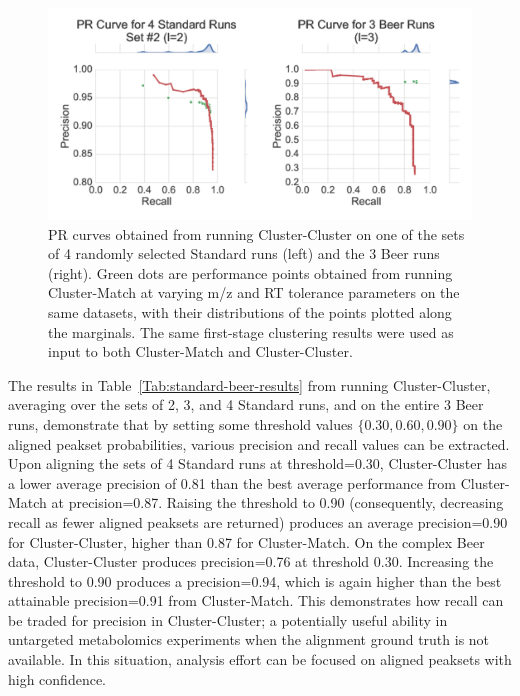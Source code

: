 \begin{figure}[!htbp]
\centering
\includegraphics[width=1.0\linewidth]{05-precursor-cluster/figures/fig4.pdf}
\caption[PR curves obtained from running Cluster-Cluster on one of the sets of 4 randomly selected Standard runs (left) and the 3 Beer runs (right).]{\label{fig:pr-curve} PR curves obtained from running Cluster-Cluster on one of the sets of 4 randomly selected Standard runs (left) and the 3 Beer runs (right). Green dots are performance points obtained from running Cluster-Match at varying m/z and RT tolerance parameters on the same datasets, with their distributions of the points plotted along the marginals. The same first-stage clustering results were used as input to both Cluster-Match and Cluster-Cluster.}
\end{figure}

The results in Table~\ref{Tab:standard-beer-results} from running Cluster-Cluster, averaging over the sets of 2, 3, and 4 Standard runs, and on the entire 3 Beer runs, demonstrate that by setting some threshold values $\{0.30, 0.60, 0.90\}$ on the aligned peakset probabilities, various precision and recall values can be extracted. Upon aligning the sets of 4 Standard runs at threshold=0.30, Cluster-Cluster has a lower average precision of 0.81 than the best average performance from Cluster-Match at precision=0.87. Raising the threshold to 0.90 (consequently, decreasing recall as fewer aligned peaksets are returned) produces an average precision=0.90 for Cluster-Cluster, higher than 0.87 for Cluster-Match. On the complex Beer data, Cluster-Cluster produces precision=0.76 at threshold 0.30. Increasing the threshold to 0.90 produces a precision=0.94, which is again higher than the best attainable precision=0.91 from Cluster-Match. This demonstrates how recall can be traded for precision in Cluster-Cluster; a potentially useful ability in untargeted metabolomics experiments when the alignment ground truth is not available. In this situation, analysis effort can be focused on aligned peaksets with high confidence. 

